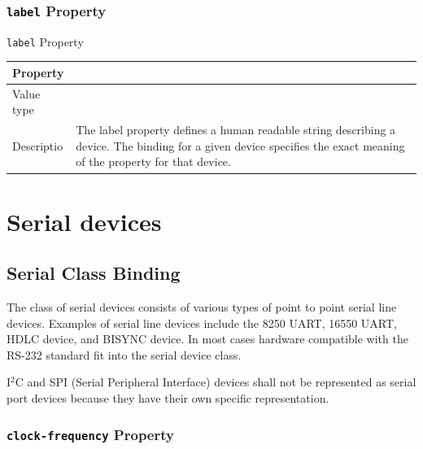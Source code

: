 \documentclass[a4paper,10pt,oneside]{sphinxmanual}
\begin{document}
\subsubsection{\texttt{label} Property}
\label{device-bindings:label-property}

\begin{threeparttable}
\capstart\caption{\texttt{label} Property}\label{device-bindings:id4}
\begin{tabulary}{\linewidth}{l J}
\hline
\textsf{\relax 
Property
} & \textsf{\relax 
{}
}\\
\hline
Value type
 & 
\\
\hline
Descriptio
 & 
The label property defines a human readable string describing
a device. The binding for a given device specifies the exact
meaning of the property for that device.
\\
\hline\end{tabulary}

\end{threeparttable}



\section{Serial devices}
\label{device-bindings:serial-devices}

\subsection{Serial Class Binding}
\label{device-bindings:serial-class-binding}
The class of serial devices consists of various types of point to point
serial line devices. Examples of serial line devices include the 8250
UART, 16550 UART, HDLC device, and BISYNC device. In most cases hardware
compatible with the RS-232 standard fit into the serial device class.

I$^{\text{2}}$C and SPI (Serial Peripheral Interface) devices shall not
be represented as serial port devices because they have their own
specific representation.


\subsubsection{\texttt{clock-frequency} Property}
\label{device-bindings:id1}
\end{document}

